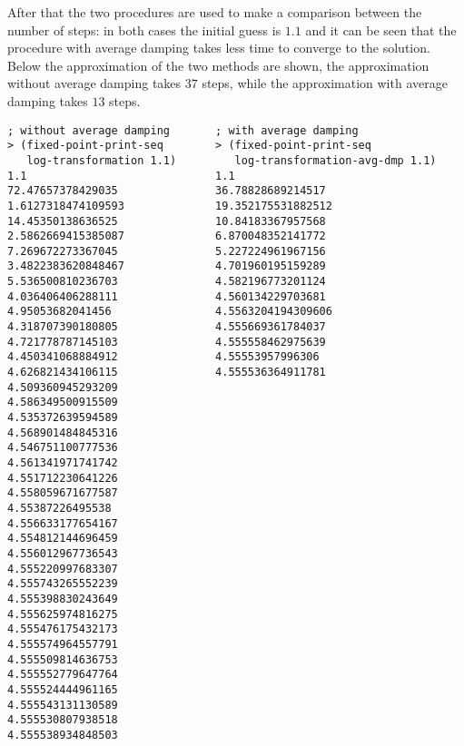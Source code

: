 After that the two procedures are used to make a comparison between the number of steps: in both cases the initial guess is $ 1.1 $
and it can be seen that the procedure with average damping takes less time to converge to the solution.
Below the approximation of the two methods are shown, the approximation without average damping takes $ 37 $ steps, while 
the approximation with average damping takes $ 13 $ steps.
\begin{lstlisting}
; without average damping       ; with average damping
> (fixed-point-print-seq        > (fixed-point-print-seq 
   log-transformation 1.1)         log-transformation-avg-dmp 1.1)
1.1                             1.1
72.47657378429035               36.78828689214517
1.6127318474109593              19.352175531882512
14.45350138636525               10.84183367957568
2.5862669415385087              6.870048352141772
7.269672273367045               5.227224961967156
3.4822383620848467              4.701960195159289
5.536500810236703               4.582196773201124
4.036406406288111               4.560134229703681
4.95053682041456                4.5563204194309606
4.318707390180805               4.555669361784037
4.721778787145103               4.555558462975639
4.450341068884912               4.55553957996306
4.626821434106115               4.555536364911781
4.509360945293209
4.586349500915509
4.535372639594589
4.568901484845316
4.546751100777536
4.561341971741742
4.551712230641226
4.558059671677587
4.55387226495538
4.556633177654167
4.554812144696459
4.556012967736543
4.555220997683307
4.555743265552239
4.555398830243649
4.555625974816275
4.555476175432173
4.555574964557791
4.555509814636753
4.555552779647764
4.555524444961165
4.555543131130589
4.555530807938518
4.555538934848503
\end{lstlisting} 

